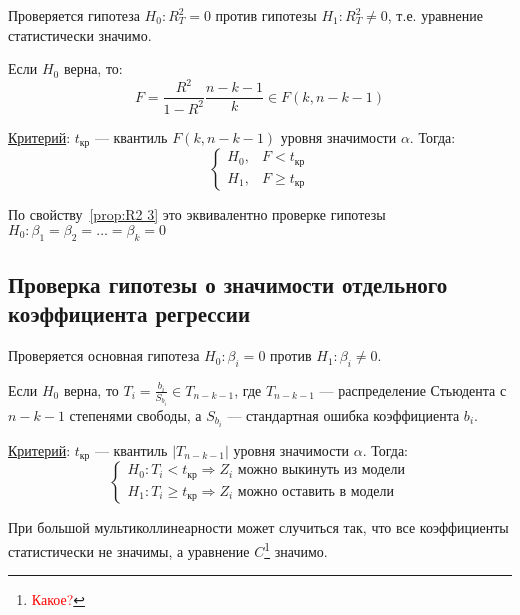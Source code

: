 Проверяется гипотеза \(H_0 : R^2_T = 0\) против гипотезы \(H_1 : R^2_T \neq 0\), т.е. уравнение статистически значимо.

\begin{theorem}
    Если \(H_0\) верна, то:
    \[F = \frac{R^2}{1 - R^2}\frac{n - k - 1}{k} \in F(k, n - k - 1)\]
\end{theorem}

\underline{Критерий}: \(t_{\text{кр}}\) --- квантиль \(F(k, n - k - 1)\) уровня значимости \(\alpha\). Тогда:
\[\begin{cases}
        H_0, & F < t_{\text{кр}}    \\
        H_1, & F \geq t_{\text{кр}}
    \end{cases}\]
\begin{remark}
    По свойству~\ref{prop:R2 3} это эквивалентно проверке гипотезы \(H_0 : \beta_1 = \beta_2 = \dots = \beta_k = 0\)
\end{remark}

\subsection{Проверка гипотезы о значимости отдельного коэффициента регрессии}

Проверяется основная гипотеза \(H_0 : \beta_i = 0\) против \(H_1 : \beta_i \neq 0\).

\begin{theorem}
    Если \(H_0\) верна, то \(T_i = \frac{b_i}{S_{b_i}} \in T_{n - k - 1}\), где \(T_{n - k - 1}\) --- распределение Стьюдента с \(n - k - 1\) степенями свободы, а \(S_{b_i}\) --- стандартная ошибка коэффициента \(b_i\).
\end{theorem}
\underline{Критерий}: \(t_{\text{кр}}\) --- квантиль \(|T_{n - k - 1}|\) уровня значимости \(\alpha\). Тогда:
\[\begin{cases}
        H_0 : T_i < t_{\text{кр}} \Rightarrow Z_i \text{ можно выкинуть из модели} \\
        H_1 : T_i \geq t_{\text{кр}} \Rightarrow Z_i \text{ можно оставить в модели}
    \end{cases}\]

При большой мультиколлинеарности может случиться так, что все коэффициенты статистически не значимы, а уравнение \(C\)\footnote{\textcolor{red}{Какое?}} значимо.
